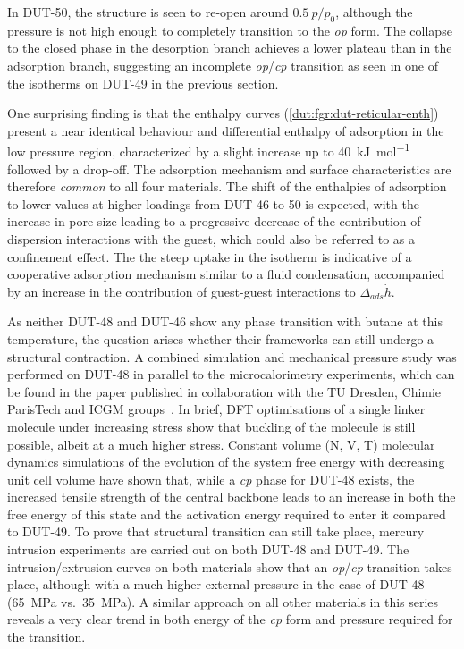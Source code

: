 In DUT-50, the structure is seen to re-open around \(0.5~p/p_0\), although 
the pressure is not high enough to completely transition to the
\textit{op} form. The collapse to the closed phase in the desorption
branch achieves a lower plateau than in the adsorption branch,
suggesting an incomplete \textit{op}/\textit{cp} transition as seen in one 
of the isotherms on DUT-49 in the previous section.

One surprising finding is that the enthalpy curves 
(\autoref{dut:fgr:dut-reticular-enth}) present a near
identical behaviour and differential enthalpy of adsorption in the 
low pressure region, characterized by a slight increase up to 
\SI{40}{\kilo\joule\per\mol} followed by a drop-off. The adsorption
mechanism and surface characteristics are therefore \textit{common} to 
all four materials. The shift of the enthalpies of adsorption to lower 
values at higher loadings from DUT-46 to 50 is expected, with the increase
in pore size leading to a progressive decrease of the contribution 
of dispersion interactions with the guest, which could also be 
referred to as a confinement effect. The the steep uptake in the isotherm
is indicative of a cooperative adsorption mechanism similar to a fluid
condensation, accompanied by an increase in the contribution of 
guest-guest interactions to \(\Delta_{ads} \dot{h}\).

As neither DUT-48 and DUT-46 show any phase transition with
butane at this temperature, the question arises whether their frameworks
can still undergo a structural contraction. A combined simulation and 
mechanical pressure study was performed on DUT-48 in parallel to the 
microcalorimetry experiments, which can be found in the paper 
published in collaboration with the TU Dresden, Chimie ParisTech and 
ICGM groups~\cite{krauseAdsorptionContractionMechanics2018}.
In brief, DFT optimisations of a single linker molecule under increasing
stress show that buckling of the molecule is still possible, albeit
at a much higher stress. Constant volume (N, V, T) molecular dynamics
simulations of the evolution of the system free energy with decreasing
unit cell volume have shown that, while a \textit{cp} phase for DUT-48
exists, the increased tensile strength of the central backbone leads
to an increase in both the free energy of this state and the activation
energy required to enter it compared to DUT-49. To prove that structural
transition can still take place, mercury intrusion experiments are 
carried out on both DUT-48 and DUT-49. The intrusion/extrusion 
curves on both materials show that an \textit{op}/\textit{cp} transition takes
place, although with a much higher external pressure in the case 
of DUT-48 (\SI{65}{\mega\pascal} vs.\ \SI{35}{\mega\pascal}). A similar 
approach on all other materials in this series reveals a very clear
trend in both energy of the \textit{cp} form and pressure required 
for the transition.

